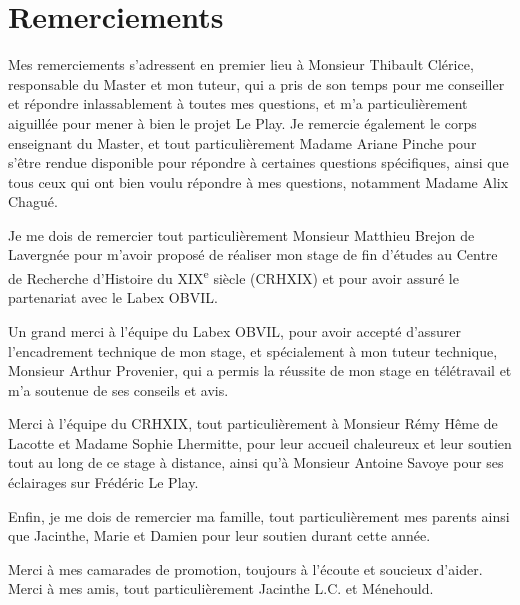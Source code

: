 \chapter*{Remerciements}
\hugeskip

Mes remerciements s'adressent en premier lieu à Monsieur Thibault Clérice, responsable du Master  et mon tuteur, qui a pris de son temps pour me conseiller et répondre inlassablement à toutes mes questions, et m'a particulièrement aiguillée pour mener à bien le projet Le Play. Je remercie également le corps enseignant du Master, et tout particulièrement Madame Ariane Pinche pour s'être rendue disponible pour répondre à certaines questions spécifiques, ainsi que tous ceux qui ont bien voulu répondre à mes questions, notamment Madame Alix Chagué.

Je me dois de remercier tout particulièrement Monsieur Matthieu Brejon de Lavergnée pour m'avoir proposé de réaliser mon stage de fin d'études au  Centre de Recherche d'Histoire du XIX\textsuperscript{e} siècle (CRHXIX) et pour avoir assuré le partenariat avec le Labex OBVIL.

Un grand merci à l'équipe du Labex OBVIL, pour avoir accepté d'assurer l'encadrement technique de mon stage, et spécialement à mon tuteur technique, Monsieur Arthur Provenier,  qui a permis la réussite de mon stage en télétravail et m'a soutenue de ses conseils et avis.

Merci à l'équipe du CRHXIX, tout particulièrement à Monsieur Rémy Hême de Lacotte et Madame Sophie Lhermitte, pour leur accueil chaleureux et leur soutien tout au long de ce stage à distance, ainsi qu'à Monsieur Antoine Savoye pour ses éclairages sur Frédéric Le Play.

Enfin, je me dois de remercier ma famille, tout particulièrement mes parents ainsi que Jacinthe, Marie et Damien pour leur soutien durant cette année.

Merci à mes camarades de promotion, toujours à l'écoute et soucieux d'aider. Merci à mes amis, tout particulièrement Jacinthe L.C. et Ménehould.\\



